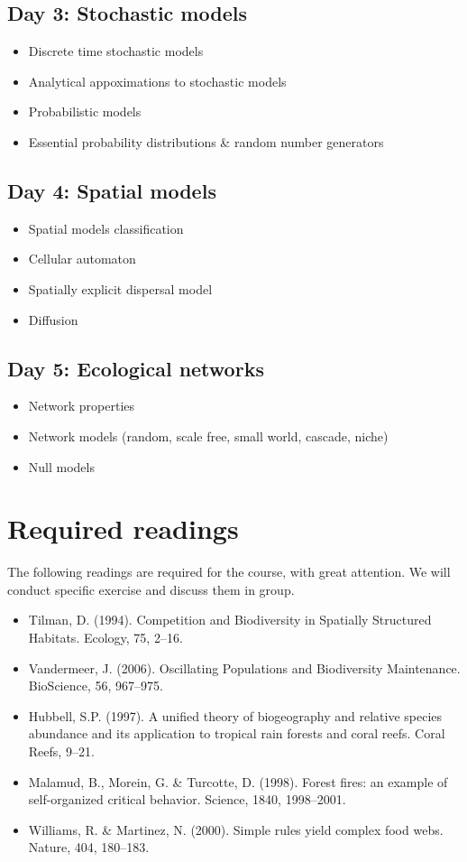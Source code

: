 \documentclass[11]{article}
\begin{document}
	\subsection*{Day 3: Stochastic models}
	\begin{itemize}
		\item Discrete time stochastic models
		\item Analytical appoximations to stochastic models
		\item Probabilistic models
		\item Essential probability distributions \& random number generators
	\end{itemize}

	\subsection*{Day 4: Spatial models}
	\begin{itemize}
		\item Spatial models classification
		\item Cellular automaton
		\item Spatially explicit dispersal model
		\item Diffusion
	\end{itemize}

	\subsection*{Day 5: Ecological networks}
	\begin{itemize}
		\item Network properties
		\item Network models (random, scale free, small world, cascade, niche)
		\item Null models
	\end{itemize}

	\section*{Required readings}
The following readings are required for the course, with great attention. We will conduct specific exercise and discuss them in group.
	\begin{itemize}
		\item Tilman, D. (1994). Competition and Biodiversity in Spatially Structured Habitats. Ecology, 75, 2–16.
		\item Vandermeer, J. (2006). Oscillating Populations and Biodiversity Maintenance. BioScience, 56, 967–975.
		\item Hubbell, S.P. (1997). A unified theory of biogeography and relative species abundance and its application to tropical rain forests and coral reefs. Coral Reefs, 9–21.
		\item Malamud, B., Morein, G. \& Turcotte, D. (1998). Forest fires: an example of self-organized critical behavior. Science, 1840, 1998–2001.
		\item Williams, R. \& Martinez, N. (2000). Simple rules yield complex food webs. Nature, 404, 180–183.
	\end{itemize}
\end{document}
